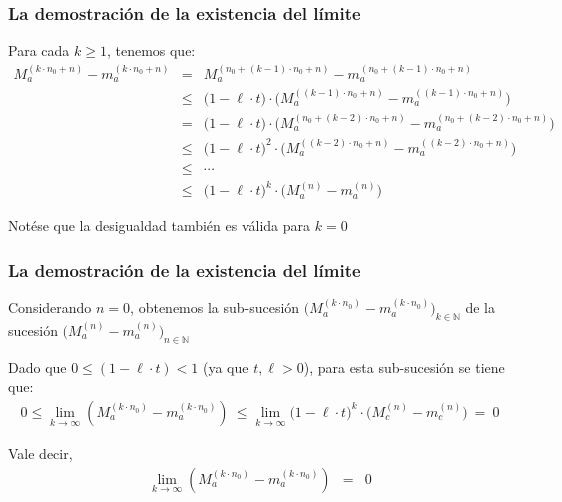 
\begin{frame}
\frametitle{La demostración de la existencia del límite}

{\footnotesize



Para cada $k \geq 1$, tenemos que:
\begin{eqnarray*}
M_a^{(k\cdot n_0 + n)} - m_a^{(k\cdot n_0 + n)} & = & M_a^{(n_0 + (k-1) \cdot n_0 + n)} - m_a^{(n_0 + (k-1) \cdot n_0 + n)}\\
& \leq & \big(1 - \ell \cdot t\big)\cdot \big(M_a^{((k-1)\cdot n_0 + n)} - m_a^{((k-1)\cdot n_0 + n)}\big)  \\
& = & \big(1 - \ell \cdot t\big)\cdot \big(M_a^{(n_0 + (k-2)\cdot n_0 + n)} - m_a^{(n_0 + (k-2)\cdot n_0 + n)}\big)  \\
& \leq & \big(1 - \ell \cdot t\big)^2 \cdot \big(M_a^{((k-2)\cdot n_0 + n)} - m_a^{((k-2)\cdot n_0 + n)}\big)  \\
& \leq & \cdots \\
& \leq & \big(1 - \ell \cdot t\big)^k \cdot \big(M_a^{(n)} - m_a^{(n)}\big)
\end{eqnarray*}


Notése que la desigualdad también es válida para $k=0$

}

\end{frame}

\begin{frame}
\frametitle{La demostración de la existencia del límite}

{\footnotesize

Considerando $n=0$, obtenemos la sub-sucesión $\big(M_a^{(k \cdot n_0)} - m_a^{(k \cdot n_0)}\big)_{k \in \mathbb{N}}$ de la sucesión $\big(M_a^{(n)} - m_a^{(n)}\big)_{n \in \mathbb{N}}$


Dado que $0 \leq (1 - \ell \cdot t) < 1$ (ya que $t, \ell > 0$), para esta sub-sucesión se tiene que:
\begin{eqnarray*}
0 \leq \lim_{k \to \infty} (M_a^{(k \cdot n_0)} - m_a^{(k \cdot n_0)}) \ \leq 
\lim_{k \to \infty} \big(1 - \ell \cdot t\big)^k \cdot \big(M_c^{(n)} - m_c^{(n)}\big) \ = \ 0
\end{eqnarray*}


Vale decir,
\begin{eqnarray*}
\lim_{k \to \infty} (M_a^{(k \cdot n_0)} - m_a^{(k \cdot n_0)}) & = & 0
\end{eqnarray*}

}

\end{frame}

